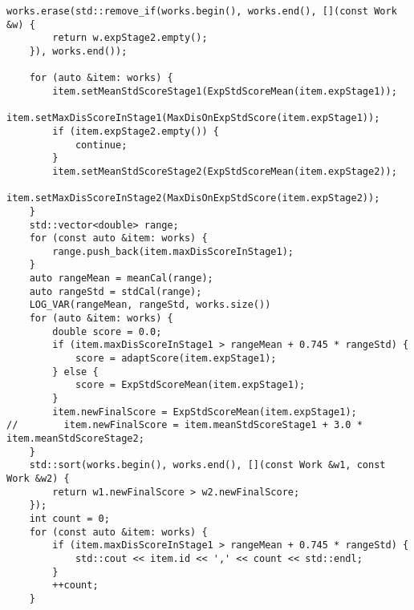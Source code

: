 \documentclass[bwprint]{gmcmthesis}
\begin{document}
\begin{lstlisting}[label=问题4,caption={问题4代码}]
works.erase(std::remove_if(works.begin(), works.end(), [](const Work &w) {
        return w.expStage2.empty();
    }), works.end());

    for (auto &item: works) {
        item.setMeanStdScoreStage1(ExpStdScoreMean(item.expStage1));
        item.setMaxDisScoreInStage1(MaxDisOnExpStdScore(item.expStage1));
        if (item.expStage2.empty()) {
            continue;
        }
        item.setMeanStdScoreStage2(ExpStdScoreMean(item.expStage2));
        item.setMaxDisScoreInStage2(MaxDisOnExpStdScore(item.expStage2));
    }
    std::vector<double> range;
    for (const auto &item: works) {
        range.push_back(item.maxDisScoreInStage1);
    }
    auto rangeMean = meanCal(range);
    auto rangeStd = stdCal(range);
    LOG_VAR(rangeMean, rangeStd, works.size())
    for (auto &item: works) {
        double score = 0.0;
        if (item.maxDisScoreInStage1 > rangeMean + 0.745 * rangeStd) {
            score = adaptScore(item.expStage1);
        } else {
            score = ExpStdScoreMean(item.expStage1);
        }
        item.newFinalScore = ExpStdScoreMean(item.expStage1);
//        item.newFinalScore = item.meanStdScoreStage1 + 3.0 * item.meanStdScoreStage2;
    }
    std::sort(works.begin(), works.end(), [](const Work &w1, const Work &w2) {
        return w1.newFinalScore > w2.newFinalScore;
    });
    int count = 0;
    for (const auto &item: works) {
        if (item.maxDisScoreInStage1 > rangeMean + 0.745 * rangeStd) {
            std::cout << item.id << ',' << count << std::endl;
        }
        ++count;
    }
\end{lstlisting}
\end{document}

